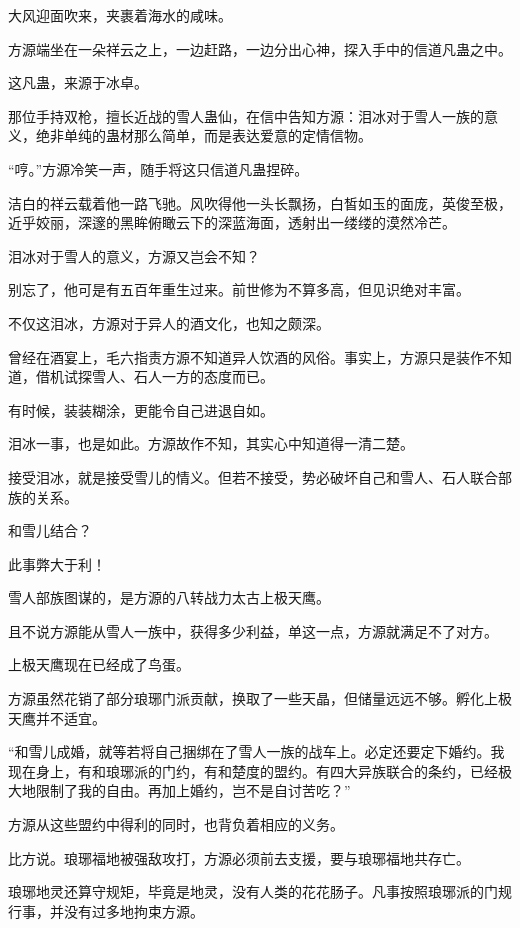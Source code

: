 
\begin{this_body}

大风迎面吹来，夹裹着海水的咸味。

方源端坐在一朵祥云之上，一边赶路，一边分出心神，探入手中的信道凡蛊之中。

这凡蛊，来源于冰卓。

那位手持双枪，擅长近战的雪人蛊仙，在信中告知方源：泪冰对于雪人一族的意义，绝非单纯的蛊材那么简单，而是表达爱意的定情信物。

“哼。”方源冷笑一声，随手将这只信道凡蛊捏碎。

洁白的祥云载着他一路飞驰。风吹得他一头长飘扬，白皙如玉的面庞，英俊至极，近乎姣丽，深邃的黑眸俯瞰云下的深蓝海面，透射出一缕缕的漠然冷芒。

泪冰对于雪人的意义，方源又岂会不知？

别忘了，他可是有五百年重生过来。前世修为不算多高，但见识绝对丰富。

不仅这泪冰，方源对于异人的酒文化，也知之颇深。

曾经在酒宴上，毛六指责方源不知道异人饮酒的风俗。事实上，方源只是装作不知道，借机试探雪人、石人一方的态度而已。

有时候，装装糊涂，更能令自己进退自如。

泪冰一事，也是如此。方源故作不知，其实心中知道得一清二楚。

接受泪冰，就是接受雪儿的情义。但若不接受，势必破坏自己和雪人、石人联合部族的关系。

和雪儿结合？

此事弊大于利！

雪人部族图谋的，是方源的八转战力太古上极天鹰。

且不说方源能从雪人一族中，获得多少利益，单这一点，方源就满足不了对方。

上极天鹰现在已经成了鸟蛋。

方源虽然花销了部分琅琊门派贡献，换取了一些天晶，但储量远远不够。孵化上极天鹰并不适宜。

“和雪儿成婚，就等若将自己捆绑在了雪人一族的战车上。必定还要定下婚约。我现在身上，有和琅琊派的门约，有和楚度的盟约。有四大异族联合的条约，已经极大地限制了我的自由。再加上婚约，岂不是自讨苦吃？”

方源从这些盟约中得利的同时，也背负着相应的义务。

比方说。琅琊福地被强敌攻打，方源必须前去支援，要与琅琊福地共存亡。

琅琊地灵还算守规矩，毕竟是地灵，没有人类的花花肠子。凡事按照琅琊派的门规行事，并没有过多地拘束方源。


\end{this_body}
